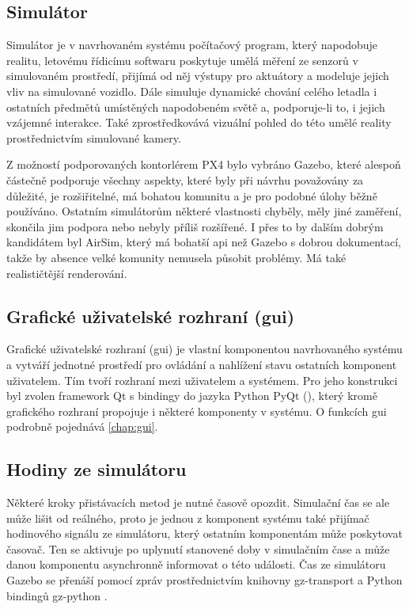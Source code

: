     \subsection{Simulátor}
      Simulátor je v navrhovaném systému počítačový program, který napodobuje realitu, letovému řídicímu softwaru poskytuje umělá měření ze senzorů v simulovaném prostředí, přijímá od něj výstupy pro aktuátory a modeluje jejich vliv na simulované vozidlo. Dále simuluje dynamické chování celého letadla i ostatních předmětů umístěných napodobeném světě a, podporuje-li to, i jejich vzájemné interakce. Také zprostředkovává vizuální pohled do této umělé reality prostřednictvím simulované kamery.

      Z možností podporovaných kontorlérem PX4 bylo vybráno Gazebo, které alespoň částečně podporuje všechny aspekty, které byly při návrhu považovány za důležité, je rozšiřitelné, má bohatou komunitu a je pro podobné úlohy běžně používáno. Ostatním simulátorům některé vlastnosti chyběly, měly jiné zaměření, skončila jim podpora nebo nebyly příliš rozšířené. I přes to by dalším dobrým kandidátem byl AirSim, který má bohatší \acrshort{api} než Gazebo s dobrou dokumentací, takže by absence velké komunity nemusela působit problémy. Má také realističtější renderování.
    \subsection{Grafické uživatelské rozhraní (\acrshort{gui})}
      Grafické uživatelské rozhraní (\acrshort{gui}) je vlastní komponentou navrhovaného systému a vytváří jednotné prostředí pro ovládání a nahlížení stavu ostatních komponent uživatelem. Tím tvoří rozhraní mezi uživatelem a systémem. Pro jeho konstrukci byl zvolen framework Qt s bindingy do jazyka Python PyQt (\cite{pyqt}), který kromě grafického rozhraní propojuje i některé komponenty v systému. O funkcích \acrshort{gui} podrobně pojednává \cref{chap:gui}. 
    \subsection{Hodiny ze simulátoru}
      Některé kroky přistávacích metod je nutné časově opozdit. Simulační čas se ale může lišit od reálného, proto je jednou z komponent systému také přijímač hodinového signálu ze simulátoru, který ostatním komponentám může poskytovat časovač. Ten se aktivuje po uplynutí stanovené doby v simulačním čase a může danou komponentu asynchronně informovat o této události. Čas ze simulátoru Gazebo se přenáší pomocí zpráv prostřednictvím knihovny gz-transport a Python bindingů gz-python \cite{gz-python}. 
